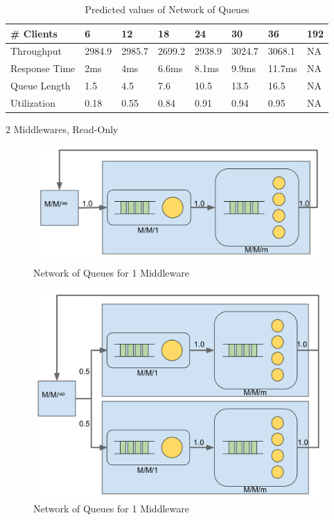 \documentclass[11pt,a4paper]{article}
\begin{document}
\begin{table}
    \begin{subtable}{1.0\linewidth}\centering
        \begin{tabular}{llllllll}
        \hline
        \# Clients & 6 & 12 & 18 & 24 & 30 & 36 & 192\\
        \hline
        Throughput & 2984.9 & 2985.7 & 2699.2 & 2938.9 & 3024.7 & 3068.1 & NA\\
        Response Time & 2ms & 4ms & 6.6ms & 8.1ms & 9.9ms & 11.7ms & NA\\
        Queue Length & 1.5 & 4.5 & 7.6 & 10.5 & 13.5 & 16.5 & NA\\
        Utilization & 0.18 & 0.55 & 0.84 & 0.91 & 0.94 & 0.95 & NA\\
        \hline
        \end{tabular}
    \caption{2 Middlewares, Read-Only}
    \end{subtable}
    \caption{Predicted values of Network of Queues}
    \label{Table:NetworkOfQueues}
\end{table}

\begin{figure}
    \includegraphics[width=.7\linewidth]{plots/NetworkOfQueues1MW.svg}
    \caption{Network of Queues for 1 Middleware}
    \label{fig:7-3:1MW}
\end{figure}

\begin{figure}
    \includegraphics[width=.7\linewidth]{plots/NetworkOfQueues2MW.svg}
    \caption{Network of Queues for 1 Middleware}
    \label{fig:7-3:2MW}
\end{figure}
\end{document}
